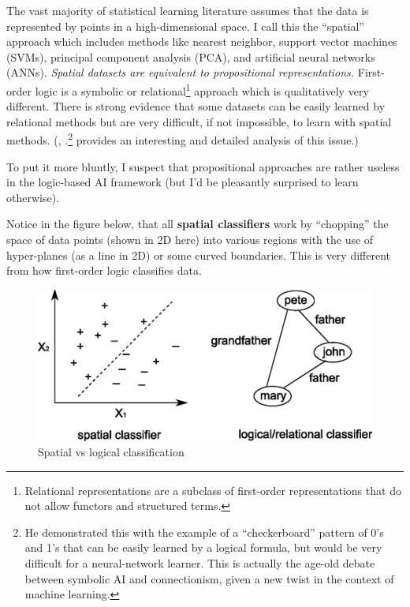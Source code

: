 \documentclass[a4paper]{report}
\begin{document}
The vast majority of statistical learning literature assumes that the data is represented by points in a high-dimensional space.  I call this the ``spatial'' approach which includes methods like nearest neighbor, support vector machines (SVMs), principal component analysis (PCA), and artificial neural networks (ANNs).  \textit{Spatial datasets are equivalent to propositional representations.}  First-order logic is a symbolic or relational\footnote{Relational representations are a subclass of first-order representations that do not allow functors and structured terms.} approach which is qualitatively very different.  There is strong evidence that some datasets can be easily learned by relational methods but are very difficult, if not impossible, to learn with spatial methods.  (\citep*{Thornton1996}, \citep*{Thornton2000}.\footnote{He demonstrated this with the example of a ``checkerboard'' pattern of 0's and 1's that can be easily learned by a logical formula, but would be very difficult for a neural-network learner.  This is actually the age-old debate between symbolic AI and connectionism, given a new twist in the context of machine learning.} provides an interesting and detailed analysis of this issue.)

To put it more bluntly, I suspect that propositional approaches are rather useless in the logic-based AI framework (but I'd be pleasantly surprised to learn otherwise).

Notice in the figure below, that all \textbf{spatial classifiers} work by ``chopping'' the space of data points (shown in 2D here) into various regions with the use of hyper-planes (as a line in 2D) or some curved boundaries.  This is very different from how first-order logic classifies data.

\begin{figure}[H]
\includegraphics{spatial-vs-logical.eps}
\caption{Spatial vs logical classification}
\end{figure}
\end{document}
